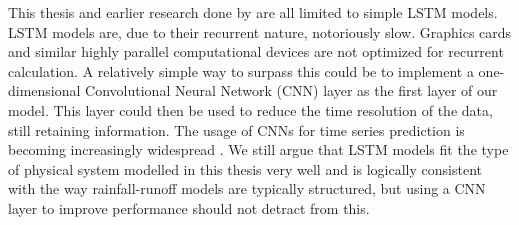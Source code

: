 This thesis and earlier research done by \citet{lstm_first_paper,lstm_second_paper,lstm_third_paper} 
are all limited to simple LSTM models. LSTM models are, due to their recurrent nature, 
notoriously slow. Graphics cards and similar highly parallel computational devices 
are not optimized for recurrent calculation. A relatively 
simple way to surpass this could be to implement a one-dimensional 
Convolutional Neural Network (CNN) layer as the first layer of our model. This 
layer could then be used to reduce the time resolution of the data, still retaining 
information. The usage of CNNs for time series prediction is becoming increasingly
widespread \citep{CNN-timeseries}. We still argue that LSTM models fit the type of
physical system modelled in this thesis very well and is logically consistent 
with the way rainfall-runoff 
models are typically structured, but using a CNN layer to improve performance 
should not detract from this.
